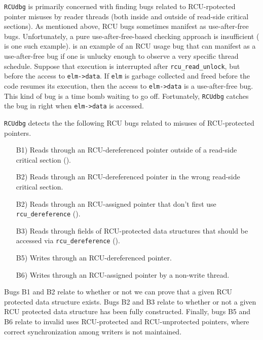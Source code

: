 \documentclass[preprint]{sigplanconf}
\begin{document}
\texttt{RCUdbg} is primarily concerned with finding bugs related to RCU-rpotected pointer misuses by reader threads (both inside and outside of read-side critical sections). As mentioned above, RCU bugs sometimes manifest as use-after-free bugs. Unfortunately, a pure use-after-free-based checking approach is insufficient ( is one such example).  is an example of an RCU usage bug that can manifest as a use-after-free bug if one is unlucky enough to observe a very specific thread schedule. Suppose that execution is interrupted after \texttt{rcu\_read\_unlock}, but before the access to \texttt{elm->data}. If \texttt{elm} is garbage collected and freed before the code resumes its execution, then the access to \texttt{elm->data} is a use-after-free bug. This kind of bug is a time bomb waiting to go off. Fortunately, \texttt{RCUdbg} catches the bug in  right when \texttt{elm->data} is accessed.




\texttt{RCUdbg} detects the the following RCU bugs related to misuses of RCU-protected pointers.
\begin{itemize}[leftmargin=3.2em]
	\item[B1)] Reads through an RCU-dereferenced pointer outside of a read-side critical section ().
	\item[B2)] Reads through an RCU-dereferenced pointer in the wrong read-side critical section.

	\item[B2)] Reads through an RCU-assigned pointer that don't first use \texttt{rcu\_dereference} ().
	\item[B3)] Reads through fields of RCU-protected data structures that should be accessed via \texttt{rcu\_dereference} ().
	
	\item[B5)] Writes through an RCU-dereferenced pointer.
	\item[B6)] Writes through an RCU-assigned pointer by a non-write thread.
\end{itemize}

Bugs B1 and B2 relate to whether or not we can prove that a given RCU protected data structure exists. Bugs B2 and B3 relate to whether or not a given RCU protected data structure has been fully constructed. Finally, bugs B5 and B6 relate to invalid uses RCU-protected and RCU-unprotected pointers, where correct synchronization among writers is not maintained.
\end{document}
